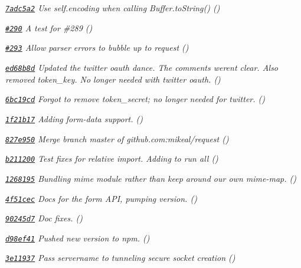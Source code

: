 \begin{DoxyItemize}
\item {\itshape \href{https://github.com/mikeal/request/commit/7adc5a21869bc92cc3b5e84d32c585952c8e5e87}{\tt 7adc5a2} Use self.\+encoding when calling Buffer.\+to\+String() ()}
\item {\itshape \href{https://github.com/mikeal/request/pull/290}{\tt \#290} A test for \#289 ()}
\item {\itshape \href{https://github.com/mikeal/request/pull/293}{\tt \#293} Allow parser errors to bubble up to request ()}
\item {\itshape \href{https://github.com/mikeal/request/commit/ed68b8dd024561e9d47d80df255fb79d783c13a7}{\tt ed68b8d} Updated the twitter oauth dance. The comments weren\textquotesingle{}t clear. Also removed token\+\_\+key. No longer needed with twitter oauth. ()}
\item {\itshape \href{https://github.com/mikeal/request/commit/6bc19cda351b59f8e45405499a100abd0b456e42}{\tt 6bc19cd} Forgot to remove token\+\_\+secret; no longer needed for twitter. ()}
\item {\itshape \href{https://github.com/mikeal/request/commit/1f21b17fc4ff3a7011b23e3c9261d66effa3aa40}{\tt 1f21b17} Adding form-\/data support. ()}
\item {\itshape \href{https://github.com/mikeal/request/commit/827e950500746eb9d3a3fa6f174416b194c9dedf}{\tt 827e950} Merge branch \textquotesingle{}master\textquotesingle{} of github.\+com\+:mikeal/request ()}
\item {\itshape \href{https://github.com/mikeal/request/commit/b2112009a31fc7f9122970d392750f62b6e77111}{\tt b211200} Test fixes for relative import. Adding to run all ()}
\item {\itshape \href{https://github.com/mikeal/request/commit/1268195b75bd5bb3954b4c4f2d9feb80a97994d1}{\tt 1268195} Bundling mime module rather than keep around our own mime-\/map. ()}
\item {\itshape \href{https://github.com/mikeal/request/commit/4f51cecdc363946b957585c3deccfd8c37e19aa0}{\tt 4f51cec} Docs for the form A\+P\+I, pumping version. ()}
\item {\itshape \href{https://github.com/mikeal/request/commit/90245d7199215d7b195cf7e36b203ca0bd0a6bd3}{\tt 90245d7} Doc fixes. ()}
\item {\itshape \href{https://github.com/mikeal/request/commit/d98ef411c560bd1168f242c524a378914ff8eac4}{\tt d98ef41} Pushed new version to npm. ()}
\item {\itshape \href{https://github.com/mikeal/request/commit/3e119375acda2da225afdb1596f6346dbd551fba}{\tt 3e11937} Pass servername to tunneling secure socket creation ()}

\end{DoxyItemize}
